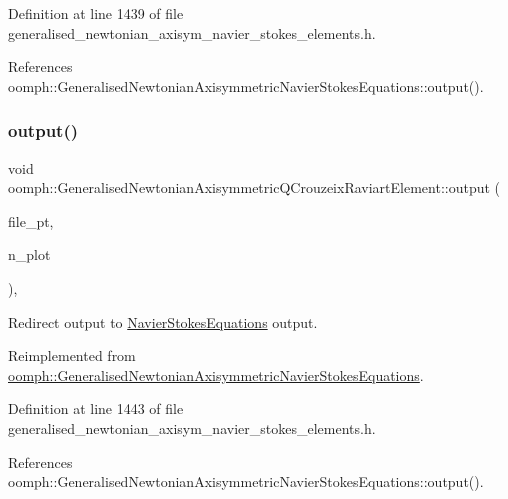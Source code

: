 Definition at line 1439 of file generalised\+\_\+newtonian\+\_\+axisym\+\_\+navier\+\_\+stokes\+\_\+elements.\+h.



References oomph\+::\+Generalised\+Newtonian\+Axisymmetric\+Navier\+Stokes\+Equations\+::output().

\mbox{\label{classoomph_1_1GeneralisedNewtonianAxisymmetricQCrouzeixRaviartElement_ad5949f8a416c48a56e82a154d9a9bfbe}} 
\subsubsection{\texorpdfstring{output()}{output()}\hspace{0.1cm}{\footnotesize\ttfamily [4/4]}}
{\footnotesize\ttfamily void oomph\+::\+Generalised\+Newtonian\+Axisymmetric\+Q\+Crouzeix\+Raviart\+Element\+::output (\begin{DoxyParamCaption}\item[{F\+I\+LE $\ast$}]{file\+\_\+pt,  }\item[{const unsigned \&}]{n\+\_\+plot }\end{DoxyParamCaption})\hspace{0.3cm}{\ttfamily [inline]}, {\ttfamily [virtual]}}



Redirect output to \hyperlink{classoomph_1_1NavierStokesEquations}{Navier\+Stokes\+Equations} output. 



Reimplemented from \hyperlink{classoomph_1_1GeneralisedNewtonianAxisymmetricNavierStokesEquations_a9aae32c881c1c55c2d20c579bf5438f7}{oomph\+::\+Generalised\+Newtonian\+Axisymmetric\+Navier\+Stokes\+Equations}.



Definition at line 1443 of file generalised\+\_\+newtonian\+\_\+axisym\+\_\+navier\+\_\+stokes\+\_\+elements.\+h.



References oomph\+::\+Generalised\+Newtonian\+Axisymmetric\+Navier\+Stokes\+Equations\+::output().

